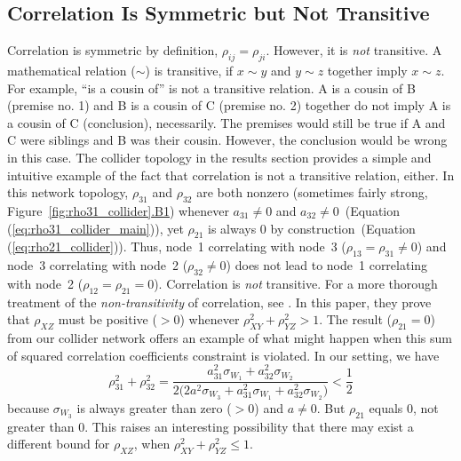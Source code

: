 \documentclass[12pt]{article}
\begin{document}
\subsection*{Correlation Is Symmetric but Not Transitive}

Correlation is symmetric by definition, $\rho_{ij}=\rho_{ji}$. However, it is \emph{not} transitive. A mathematical relation ($\sim$) is transitive, if $x\sim y$
and $y\sim z$ together imply $x\sim z$. For example, ``is a cousin of'' is not a transitive relation. A is a cousin of B (premise no. 1) and B is a cousin of C (premise no. 2) together do not imply A is a cousin of C (conclusion), necessarily. The premises would still be true if A and C were siblings and B was their cousin. However, the conclusion would be wrong in this case. 
The collider topology in the results section provides a simple and intuitive example of the fact that correlation is not a transitive relation, either. In this network topology, $\rho_{31}$ and
$\rho_{32}$ are both nonzero (sometimes fairly strong, Figure~\ref{fig:rho31_collider}\hyperref[fig:collider_B1]{.B1}) whenever $a_{31}\neq0$ and
$a_{32}\neq0$~(Equation (\ref{eq:rho31_collider_main})), yet
$\rho_{21}$ is always 0 by construction~(Equation (\ref{eq:rho21_collider})).
Thus, node~1 correlating with node~3 ($\rho_{13}=\rho_{31}\neq0$) and node~3 correlating with node~2 ($\rho_{32}\neq0$) does not lead to node~1 correlating with node~2 ($\rho_{12}=\rho_{21}=0$). Correlation is \emph{not} transitive. For a more thorough treatment of the \emph{non-transitivity} of correlation, see \citet{LangfordSchwertmanOwens2001}. In this paper, they prove that $\rho_{XZ}$ must be
positive ($>0$) whenever $\rho_{XY}^2+\rho_{YZ}^2>1$. The result ($\rho_{21}=0$) from our collider network offers an example of what might happen when this sum of squared correlation coefficients constraint is violated. In our setting, we have
\begin{equation*}
\rho_{31}^2+\rho_{32}^2 = \frac{a_{31}^2\sigma_{W_1}+a_{32}^2\sigma_{W_2}}
{2\bigl(2a^2\sigma_{W_3}+a_{31}^2\sigma_{W_1}+a_{32}^2\sigma_{W_2}\bigr)}
< \frac{1}{2}
\end{equation*}
because $\sigma_{W_3}$ is always greater than zero ($>0$) and $a\neq0$. But $\rho_{21}$ equals 0, not greater than 0. This raises an interesting possibility that there may exist a different bound for $\rho_{XZ}$, when $\rho_{XY}^2+\rho_{YZ}^2\leq1$.
\end{document}
